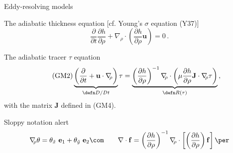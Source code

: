 \documentclass{beamer}
\begin{document}
\begin{frame}{Eddy-resolving models}
\vspace{-.2cm}
\begin{exampleblock}{The adiabatic thickness equation [cf. Young's $\sigma$ equation (Y37)]}
\begin{equation}\tag{GM1}
  \frac{\partial}{\partial t} \frac{\partial h}{\partial \rho} + \nabla_{\!\!\rho} \cdot
  \left(\frac{\partial h}{\partial \rho} \mathbf{u} \right) = 0\,.
\end{equation}
\end{exampleblock}

\begin{exampleblock}{The adiabatic tracer $\tau$ equation}
\begin{equation}\tag{GM2}
\underbrace{\left(\frac{\partial }{\partial t} + \mathbf{u}\cdot\nabla_{\!\!\rho}\right)}_{\defn D/D t}\tau
 = \underbrace{\left( \frac{\partial h}{\partial \rho}\right)^{-1}\nabla_{\!\!\rho} \cdot
 \left(\mu \frac{\partial h}{\partial \rho} \mathbf{J}
 \cdot \nabla_{\!\!\rho} \tau \right)}_{\defn R(\tau)} \,,
\end{equation}
with the matrix $\mathbf{J}$ defined in (GM4).

\end{exampleblock}


\begin{block}{Sloppy notation {\sc alert}}
\vspace{-.35cm}
\begin{equation}
  \nabla_{\!\!\rho} \theta = \theta_{\tilde x}~ \mathbf{e}_1 + \theta_{\tilde y}~ \mathbf{e}_2\com
  \qquad \nabla \cdot \mathbf{f} =  \left( \frac{\partial h}{\partial \rho}\right)^{-1}   \nabla_{\!\!\rho} \cdot
\left[ \left(\frac{\partial h}{\partial \rho}\right)\mathbf{f}\right]\per \nonumber
\end{equation}
\end{block}

\end{frame}
\end{document}
